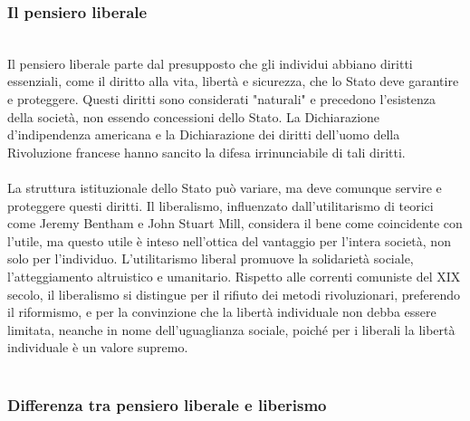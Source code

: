\documentclass{report}
\begin{document}
\subsubsection{Il pensiero liberale}
\\
Il pensiero liberale parte dal presupposto che gli individui abbiano diritti essenziali, come il diritto alla vita, libertà e sicurezza, che lo Stato deve garantire e proteggere. Questi diritti sono considerati "naturali" e precedono l'esistenza della società, non essendo concessioni dello Stato. La Dichiarazione d'indipendenza americana e la Dichiarazione dei diritti dell'uomo della Rivoluzione francese hanno sancito la difesa irrinunciabile di tali diritti.
\\
\\
La struttura istituzionale dello Stato può variare, ma deve comunque servire e proteggere questi diritti. Il liberalismo, influenzato dall'utilitarismo di teorici come Jeremy Bentham e John Stuart Mill, considera il bene come coincidente con l'utile, ma questo utile è inteso nell'ottica del vantaggio per l'intera società, non solo per l'individuo. L'utilitarismo liberal promuove la solidarietà sociale, l'atteggiamento altruistico e umanitario. Rispetto alle correnti comuniste del XIX secolo, il liberalismo si distingue per il rifiuto dei metodi rivoluzionari, preferendo il riformismo, e per la convinzione che la libertà individuale non debba essere limitata, neanche in nome dell'uguaglianza sociale, poiché per i liberali la libertà individuale è un valore supremo.
\\
\\
\subsubsection{Differenza tra pensiero liberale e liberismo}
\\
\\
\end{document}

